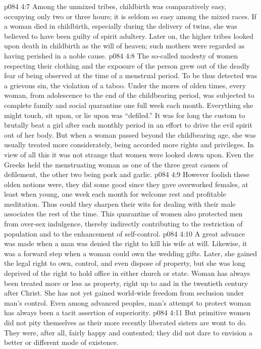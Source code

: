 \vs p084 4:7 Among the unmixed tribes, childbirth was comparatively easy, occupying only two or three hours; it is seldom so easy among the mixed races. If a woman died in childbirth, especially during the delivery of twins, she was believed to have been guilty of spirit adultery. Later on, the higher tribes looked upon death in childbirth as the will of heaven; such mothers were regarded as having perished in a noble cause.
\vs p084 4:8 The so\hyp{}called modesty of women respecting their clothing and the exposure of the person grew out of the deadly fear of being observed at the time of a menstrual period. To be thus detected was a grievous sin, the violation of a taboo. Under the mores of olden times, every woman, from adolescence to the end of the childbearing period, was subjected to complete family and social quarantine one full week each month. Everything she might touch, sit upon, or lie upon was “defiled.” It was for long the custom to brutally beat a girl after each monthly period in an effort to drive the evil spirit out of her body. But when a woman passed beyond the childbearing age, she was usually treated more considerately, being accorded more rights and privileges. In view of all this it was not strange that women were looked down upon. Even the Greeks held the menstruating woman as one of the three great causes of defilement, the other two being pork and garlic.
\vs p084 4:9 However foolish these olden notions were, they did some good since they gave overworked females, at least when young, one week each month for welcome rest and profitable meditation. Thus could they sharpen their wits for dealing with their male associates the rest of the time. This quarantine of women also protected men from over\hyp{}sex indulgence, thereby indirectly contributing to the restriction of population and to the enhancement of self\hyp{}control.
\pc \vs p084 4:10 A great advance was made when a man was denied the right to kill his wife at will. Likewise, it was a forward step when a woman could own the wedding gifts. Later, she gained the legal right to own, control, and even dispose of property, but she was long deprived of the right to hold office in either church or state. Woman has always been treated more or less as property, right up to and in the twentieth century after Christ. She has not yet gained world\hyp{}wide freedom from seclusion under man’s control. Even among advanced peoples, man’s attempt to protect woman has always been a tacit assertion of superiority.
\vs p084 4:11 But primitive women did not pity themselves as their more recently liberated sisters are wont to do. They were, after all, fairly happy and contented; they did not dare to envision a better or different mode of existence.\plusone
